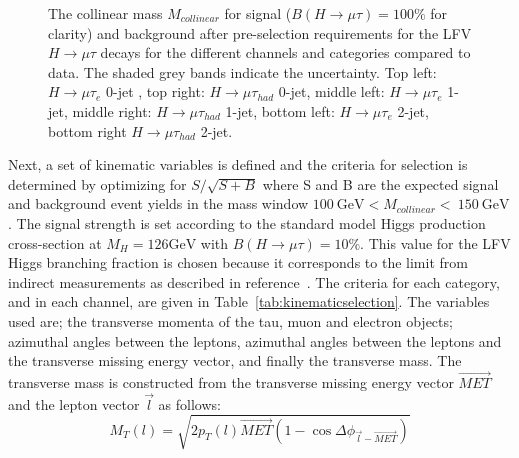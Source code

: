 \begin{figure}[hbtp]\begin{center}
 \caption{The collinear mass $M_{collinear}$ for signal ($B(H \rightarrow \mu \tau )=100\%$ for clarity) and background after pre-selection requirements for the LFV $H \rightarrow \mu \tau$  decays for the different channels and categories compared to data. The shaded grey bands indicate the uncertainty.  Top left: $H \rightarrow \mu \tau_{e}$ 0-jet , top right: $H \rightarrow \mu \tau_{had}$ 0-jet,  middle left: $H \rightarrow \mu \tau_{e}$ 1-jet, middle right: $H \rightarrow \mu \tau_{had}$
1-jet, bottom left: $H \rightarrow \mu \tau_{e}$ 2-jet, bottom right $H \rightarrow \mu \tau_{had}$ 2-jet. }
 \label{fig:Mcol_after_presel_WITHDATA}\end{center}\end{figure}




Next, a set of kinematic variables is defined and the  criteria for  selection is determined by optimizing for $S/\sqrt{S+B}$ where S and B are the expected signal and background event yields in the mass window $100\:\mathrm{GeV}< M_{collinear} < \: 150\:\mathrm{GeV}$ .
The signal strength is set according to the standard model Higgs production  cross-section at $M_{H}=126 \mathrm{GeV}$ with
$B(H \rightarrow \mu \tau )=10\%$. This value for the
LFV Higgs branching fraction is chosen because it corresponds to the limit from indirect measurements as described
in reference~\cite{Harnik:2012pb}. The criteria for each category, and in each channel, are given in Table~\ref{tab:kinematicselection}.
The variables used are; the transverse momenta of the tau, muon and electron objects;
azimuthal angles between the leptons, azimuthal angles between the leptons and the transverse missing energy vector, and finally
the transverse mass. The transverse mass is constructed from the transverse missing energy vector $\vec{MET}$
and the lepton vector $\vec{l}$ as follows:
\begin{equation*}
M_{T}(l)=\sqrt{2p_{T}(l)\vec{MET}(1-\cos{\Delta \phi_{\vec{l}-\vec{MET}}})}
\end{equation*}

